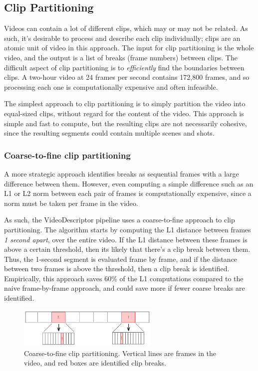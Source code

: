 \subsection{Clip Partitioning}

Videos can contain a lot of different clips, which may or may not be related.
As such, it's desirable to process and describe each clip individually; clips are an atomic unit of video in this approach.
The input for clip partitioning is the whole video, and the output is a list of breaks (frame numbers) between clips.
The difficult aspect of clip partitioning is to \textit{efficiently} find the boundaries between clips.
A two-hour video at 24 frames per second contains 172,800 frames, and so processing each one is computationally expensive and often infeasible.

The simplest approach to clip partitioning is to simply partition the video into equal-sized clips, without regard for the content of the video.
This approach is simple and fast to compute, but the resulting clips are not necessarily cohesive, since the resulting segments could contain multiple scenes and shots.

\subsubsection{Coarse-to-fine clip partitioning}
A more strategic approach identifies breaks as sequential frames with a large difference between them.
However, even computing a simple difference such as an L1 or L2 norm between each pair of frames is computationally expensive, since a norm must be taken per frame in the video.

As such, the VideoDescriptor pipeline uses a coarse-to-fine approach to clip partitioning.
The algorithm starts by computing the L1 distance between frames \textit{1 second apart}, over the entire video.
If the L1 distance between these frames is above a certain threshold, then its likely that there's a clip break between them.
Thus, the 1-second segment is evaluated frame by frame, and if the distance between two frames is above the threshold, then a clip break is identified.
Empirically, this approach saves 60\% of the L1 computations compared to the naive frame-by-frame approach, and could save more if fewer coarse breaks are identified.

\begin{figure}[h]
      \centering
      \includegraphics[width=0.6\textwidth]{figures/coarse_to_fine.png}
      \caption{Coarse-to-fine clip partitioning. Vertical lines are frames in the video, and red boxes are identified clip breaks.}
      \label{fig:coarse_to_fine}
\end{figure}


